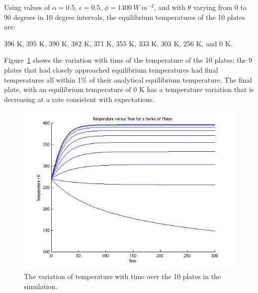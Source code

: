\begin{description}
    Using values of $\alpha =0.5$,  $\epsilon =0.5$, $\phi =
    1400~W~ m^{-2}$, and with $\theta$ varying from 0 to 90 degrees in 10 degree 
    intervals, the equilibrium temperatures of the 10 plates are:

    396 K, 395 K, 390 K, 382 K, 371 K, 355 K, 333 K, 303 K, 256 K, and 0 K.
    
    Figure~\ref{fig:ivv_F_emission_Tint} shows the variation with time of the
    temperature of the 10 plates; the 9 plates that had closely approached equilibrium temperatures had 
    final temperatures all within
    1\% of their analytical equilibrium temperature.  The final plate, with an equilibrium temperature of 0 K has a temperature
    variation that is decreasing at a rate consistent with expectations.
    
      \begin{figure}[!ht]
        \includegraphics[width=180mm]{figures/temperature-time.jpg}
        \caption{The variation of temperature with time over the 10 plates in
        the simulation.} 
        \label{fig:ivv_F_emission_Tint}
      \end{figure}
  \end{description}
    

    
\clearpage

